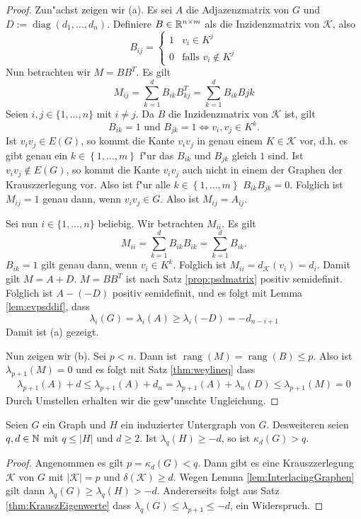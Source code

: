 \begin{proof}
  Zun"achst zeigen wir (a). Es sei $A$ die Adjazenzmatrix von $G$ und $D := \operatorname{diag}(d_1,\dots,d_n)$. Definiere $B\in{\mathbb{R}}^{n\times m}$ als die Inzidenzmatrix von $\mathcal K$, also $$B_{ij} = \begin{cases}
    1 & v_i \in K^j \\ 0 & \text{falls }v_i \notin K^j
  \end{cases}$$ 
  Nun betrachten wir $M=BB^{T}$. Es gilt
  \[
    M_{ij} = \sum\limits_{k=1}^{d}B_{ik}B^{T}_{kj} = \sum\limits_{k=1}^{d}B_{ik}B{jk}
  \]
  Seien $i,j \in \{1,\dots,n\}$ mit $i\neq j$. Da $B$ die Inzidenzmatrix von $\mathcal{K}$ ist, gilt  $$ B_{ik} = 1 \text{ und } B_{jk} = 1 \Leftrightarrow v_i,v_j \in K^{k}.$$ Ist $v_iv_j \in E(G)$, so kommt die Kante $v_iv_j$ in genau einem $K\in \mathcal{K}$ vor, d.h. es gibt genau ein $k\in \left\{ 1,\dots,m \right\}$ f"ur das $B_{ik}$ und $B_{jk}$ gleich $1$ sind. Ist $v_iv_j\notin E(G)$, so kommt die Kante $v_iv_j$ auch nicht in einem der Graphen der Krauszzerlegung vor.
  Also ist f"ur alle $k\in \left\{ 1,\dots, m \right\}$ $B_{ik}B_{jk} = 0$. Folglich ist $M_{ij}=1$ genau dann, wenn $v_iv_j\in G$. Also ist $M_{ij} = A_{ij}$.
  
  Sei nun $i\in\{1,\dots,n\}$ beliebig. Wir betrachten $M_{ii}$. Es gilt 
  \[
    M_{ii} = \sum\limits_{k=1}^{d}B_{ik}B_{ik} = \sum\limits_{k=1}^{d} B_{ik}.
  \]
  $B_{ik}=1$ gilt genau dann, wenn $v_i \in K^k$. Folglich ist $M_{ii}= d_{\mathcal{K}}(v_i)= d_i$. Damit gilt $M=A+D$. $M=BB^{T}$ ist nach Satz \ref{prop:psdmatrix} positiv semidefinit.
  Folglich ist $A- (-D)$ positiv semidefinit, und es folgt mit Lemma \ref{lem:evpsddif}, dass 
  \begin{equation*}
    \lambda_i(G) = \lambda_i(A) \geq \lambda_i(-D) = -d_{n-i+1}
  \end{equation*}
  Damit ist (a) gezeigt.

  Nun zeigen wir (b). Sei $p<n$. Dann ist $\operatorname{rang}(M)= \operatorname{rang}(B) \leq p$. Also ist $\lambda_{p+1}(M) = 0$ und es folgt mit Satz \ref{thm:weylineq} dass 
  \begin{align*}
    \lambda_{p+1}(A) + d \leq \lambda_{p+1}(A) + d_{n} = \lambda_{p+1}(A) + \lambda_{n} (D) \leq \lambda_{p+1} (M) = 0
  \end{align*}
  Durch Umstellen erhalten wir die gew"unschte Ungleichung.
\end{proof}
\begin{corollary}
  \label{cor:Korollar1}
  Seien $G$ ein Graph und $H$ ein induzierter Untergraph von $G$. Desweiteren seien $q,d \in {\mathbb{N}}$ mit $q \leq |H|$ und $d \geq 2$.
  Ist $\lambda_{q}(H) \geq -d$, so ist $\kappa_{d}(G) > q$.
\end{corollary}
\begin{proof}
  Angenommen es gilt $p = \kappa_{d}(G) < q$. Dann gibt es  eine Krauszzerlegung $\mathcal{K}$ von $G$ mit $|\mathcal{K}| = p$ und $\delta(\mathcal{K}) \geq d$. Wegen Lemma \ref{lem:InterlacingGraphen} gilt dann $\lambda_{q}(G) \geq \lambda_{q}(H) > -d $. Andererseits folgt aus Satz \ref{thm:KrauszEigenwerte} dass $\lambda_{q}(G) \leq \lambda_{p+1} \leq -d $, ein Widerspruch. 
\end{proof}

